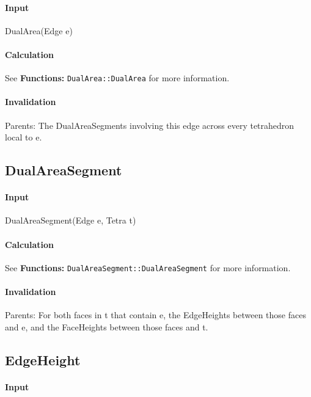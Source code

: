 \paragraph{Input}

DualArea(Edge e)

\paragraph{Calculation}

See \textbf{Functions: }\texttt{DualArea::DualArea} for more information.

\paragraph{Invalidation}

Parents: The DualAreaSegments involving this edge across every tetrahedron
local to e.

\bigskip

\subsection{DualAreaSegment}

\paragraph{Input}

DualAreaSegment(Edge e, Tetra t)

\paragraph{Calculation}

See \textbf{Functions: }\texttt{DualAreaSegment::DualAreaSegment} for more
information.

\paragraph{Invalidation}

Parents: For both faces in t that contain e, the EdgeHeights between those
faces and e, and the FaceHeights between those faces and t.

\bigskip

\subsection{EdgeHeight}

\paragraph{Input}


